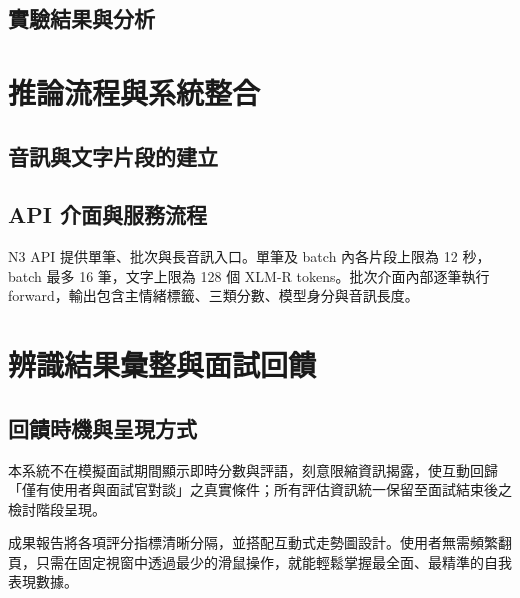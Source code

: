 \subsection{實驗結果與分析}
\FloatBarrier

\section{推論流程與系統整合}
\label{sec:inference}

\subsection{音訊與文字片段的建立}

\subsection{API 介面與服務流程}
N3 API 提供單筆、批次與長音訊入口。單筆及 batch 內各片段上限為 12 秒，batch 最多 16 筆，文字上限為 128 個 XLM-R tokens。批次介面內部逐筆執行 forward，輸出包含主情緒標籤、三類分數、模型身分與音訊長度。


\section{辨識結果彙整與面試回饋}

\subsection{回饋時機與呈現方式}
本系統不在模擬面試期間顯示即時分數與評語，刻意限縮資訊揭露，使互動回歸「僅有使用者與面試官對談」之真實條件；所有評估資訊統一保留至面試結束後之檢討階段呈現。

成果報告將各項評分指標清晰分隔，並搭配互動式走勢圖設計。使用者無需頻繁翻頁，只需在固定視窗中透過最少的滑鼠操作，就能輕鬆掌握最全面、最精準的自我表現數據。

